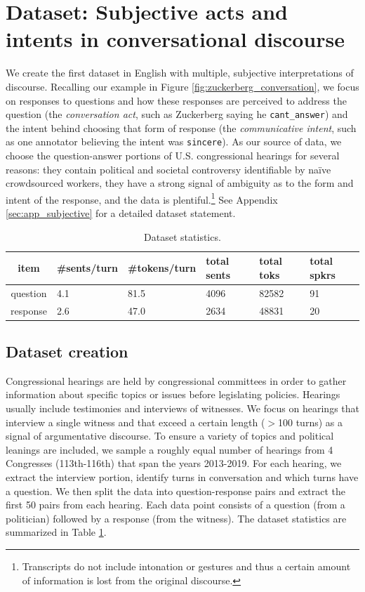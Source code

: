 \section{Dataset: Subjective acts and intents in conversational discourse}
We create the first dataset in English with multiple, subjective interpretations of discourse. Recalling our example in Figure \ref{fig:zuckerberg_conversation}, we focus on responses to questions and how these responses are perceived to address the question (the \emph{conversation act}, such as Zuckerberg saying he \texttt{cant\_answer}) and the intent behind choosing that form of response (the \emph{communicative intent}, such as one annotator believing the intent was \texttt{sincere}). As our source of data, we choose the question-answer portions of U.S. congressional hearings for several reasons: they contain political and societal controversy identifiable by na{\"i}ve crowdsourced workers, they have a strong signal of ambiguity as to the form and intent of the response, and the data is plentiful.\footnote{Transcripts do not include intonation or gestures and thus a certain amount of information is lost from the original discourse.} See Appendix \ref{sec:app_subjective} for a detailed dataset statement.

\begin{table}
\centering
\small
\vspace{-1em}
\begin{tabular}{c p{1.5cm} p{1.5cm} p{1.5cm} p{1.5cm} p{1.5cm}}
\toprule
item  & \#sents/turn     & \#tokens/turn &total sents &total toks&total spkrs     \\ 
\midrule
question  &4.1  &81.5 &4096 &82582 &91  \\
response &2.6 &47.0 &2634 &48831 &20 \\
\bottomrule
\end{tabular}
\vspace{-0.5em}
\caption{Dataset statistics.}
\label{tab:subj_corpus_stats}
\end{table}

\subsection{Dataset creation}
Congressional hearings are held by congressional committees in order to gather information about specific topics or issues before legislating policies. Hearings usually include testimonies and interviews of witnesses. We focus on hearings that interview a single witness and that exceed a certain length ($>$100 turns) as a signal of argumentative discourse. To ensure a variety of topics and political leanings are included, we sample a roughly equal number of hearings from 4 Congresses (113th-116th) that span the years 2013-2019. For each hearing, we extract the interview portion, identify turns in conversation and which turns have a question. We then split the data into question-response pairs and extract the first 50 pairs from each hearing. Each data point consists of a question (from a politician) followed by a response (from the witness). The dataset statistics are summarized in Table \ref{tab:subj_corpus_stats}.

